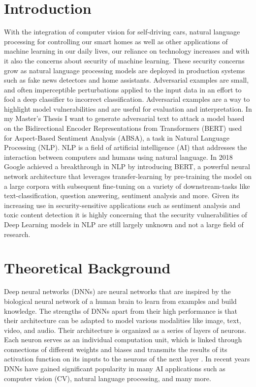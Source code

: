 \section{Introduction}

With the integration of computer vision for self-driving cars, natural language processing for controlling our smart homes as well as other applications of machine learning in our daily lives, our reliance on technology increases and with it also the concerns about security of machine learning. These security concerns grow as natural language processing models are deployed in production systems such as fake news detectors and home assistants. Adversarial examples are small, and often imperceptible perturbations applied to the input data in an effort to fool a deep classifier to incorrect classification.
Adversarial examples are a way to highlight model vulnerabilities and are useful for evaluation and interpretation. 
In my Master's Thesis I want to generate adversarial text to attack a model based on the Bidirectional Encoder Representations from Transformers (BERT) used for Aspect-Based Sentiment Analysis (ABSA), a task in Natural Language Processing (NLP). NLP is a field of artificial intelligence (AI) that addresses the interaction between computers and humans using natural language. In 2018 Google achieved a breakthrough in NLP by introducing BERT, a powerful neural network architecture that leverages transfer-learning by pre-training the model on a large corpora with subsequent fine-tuning on a variety of downstream-tasks like text-classification, question answering, sentiment analysis and more. 
Given its increasing use in security-sensitive applications such as sentiment analysis and toxic content detection it is highly concerning that the security vulnerabilities of Deep Learning models in NLP are still largely unknown and not a large field of research.

\section{Theoretical Background}
Deep neural networks (DNNs) are neural networks that are inspired by the biological neural network of a human brain to learn from examples and build knowledge. 
The strengths of DNNs apart from their high performance is that their architecture can be adapted to model various modalities like image, text, video, and audio.
Their architecture is organized as a series of layers of neurons. Each neuron serves as an individual computation unit, which is linked through connections of different weights and biases and transmits the results of its activation function on its inputs to the neurons of the next layer \cite{zhang2019adversarial}.
In recent years DNNs have gained significant popularity in many AI applications such as computer vision (CV), natural language processing, and many more.

